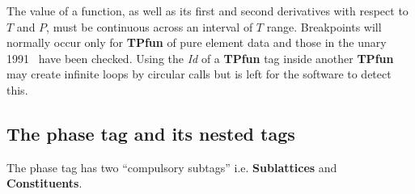 \documentclass{article}
\begin{document}
The value of a function, as well as its first and second derivatives
with respect to $T$ and $P$, must be continuous across an interval of
$T$ range.  Breakpoints will normally occur only for {\bf TPfun} of
pure element data and those in the unary 1991~\cite{91Din} have been
checked.  Using the {\em Id} of a {\bf TPfun} tag inside another {\bf
  TPfun} may create infinite loops by circular calls but is left for
the software to detect this.


\subsection{The phase tag and its nested tags}\label{sec:phase}\label{sec:dispart}

The phase tag has two ``compulsory subtags'' i.e. {\bf Sublattices}
and {\bf Constituents}.
\end{document}
